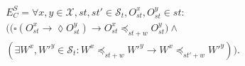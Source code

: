 \documentclass[journal, compsoc]{IEEEtran}
\begin{document}
	\begin{align}\label{eqn:PC}
	\begin{split}
	E^S_C =  \forall x,y \in \mathcal{X}, \mathit{st},\mathit{st}' \in \mathcal{S}_t, O_\mathit{st}^x, O_\mathit{st}^{y} \in \mathit{st}:  \\
	\big( \big( \square \left( O_\mathit{st}^x \rightarrow \lozenge O_\mathit{st}^{y} \right)
	\rightarrow O_\mathit{st}^x \preccurlyeq_{\mathit{st}+w} O_\mathit{st}^{y} \big) \wedge \\
	\left( \exists W^x, W'^{y} \in \mathcal{S}_t: W^x \preccurlyeq_{\mathit{st}+w} W'^{y} \rightarrow W^x \preccurlyeq_{\mathit{st'}+w} W'^{y} \right) \big).
	\end{split}
	\end{align}
\end{document}

